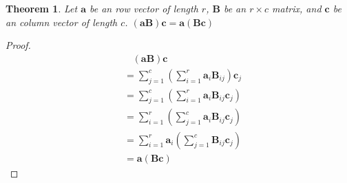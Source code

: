 \documentclass[preprint,12pt]{elsarticle}
\newcommand{\bB}{\mathbf{B}}
\newcommand{\ba}{\mathbf{a}}
\newcommand{\bc}{\mathbf{c}}
\newtheorem{theorem}{Theorem}[section]
\begin{document}
\begin{theorem}Let $\ba{}$ be an row vector of length $r$, $\bB{}$ be an $r\times c$ matrix, and $\bc$ be an column vector of length $c$.
  $(\ba{}\bB{})\bc{}=\ba{}(\bB{}\bc{})$
\end{theorem}
\begin{proof}
  \begin{align}
    &~~~~(\ba{}\bB{})\bc{}\\
    &= \sum_{j=1}^c\left(\sum_{i=1}^r\ba{}_i\bB{}_{ij}\right)\bc{}_j\\
    &= \sum_{j=1}^c\left(\sum_{i=1}^r\ba{}_i\bB{}_{ij}\bc{}_j\right)\\
    &= \sum_{i=1}^r\left(\sum_{j=1}^c\ba{}_i\bB{}_{ij}\bc{}_j\right)\\
    &= \sum_{i=1}^r\ba{}_i\left(\sum_{j=1}^c\bB{}_{ij}\bc{}_j\right)\\
    &= \ba{}(\bB{}\bc{})
  \end{align}
\end{proof}


\end{document}
